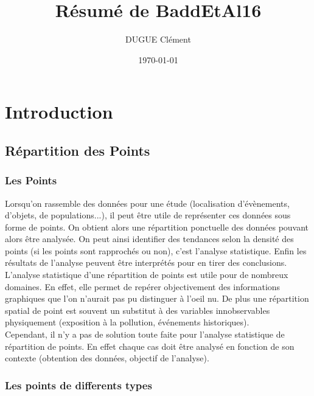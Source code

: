 \documentclass[french,12pt,a4paper]{report}
\title{Résumé de BaddEtAl16}
\author{DUGUE Clément}
\date{\today}
\begin{document}
\hypersetup{linkcolor=blue}
\maketitle
\tableofcontents


\chapter{Introduction}

\section{Répartition des Points}


\subsection{Les Points}
Lorsqu'on rassemble des données pour une étude (localisation d'évènements, d'objets, de populations...), il peut être utile de représenter ces données sous forme de points. On obtient alors une répartition ponctuelle des données pouvant alors être analysée. On peut ainsi identifier des tendances selon la densité des points (si les points sont rapprochés ou non), c'est l'analyse statistique. Enfin les résultats de l'analyse peuvent être interprétés pour en tirer des conclusions.\\

L'analyse statistique d'une répartition de points est utile pour de nombreux domaines. En effet, elle permet de repérer objectivement des informations graphiques que l'on n'aurait pas pu distinguer à l'oeil nu. De plus une répartition spatial de point est souvent un substitut à des variables innobservables physiquement (exposition à la pollution, événements historiques).\\

Cependant, il n'y a pas de solution toute faite pour l'analyse statistique de répartition de points. En effet chaque cas doit être analysé en fonction de son contexte (obtention des données, objectif de l'analyse).\\


\subsection{Les points de differents types}
\end{document}
